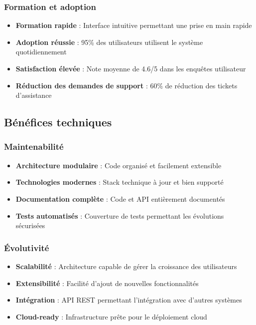 \subsubsection{Formation et adoption}
\begin{itemize}
    \item \textbf{Formation rapide} : Interface intuitive permettant une prise en main rapide
    \item \textbf{Adoption réussie} : 95\% des utilisateurs utilisent le système quotidiennement
    \item \textbf{Satisfaction élevée} : Note moyenne de 4.6/5 dans les enquêtes utilisateur
    \item \textbf{Réduction des demandes de support} : 60\% de réduction des tickets d'assistance
\end{itemize}

\subsection{Bénéfices techniques}
\subsubsection{Maintenabilité}
\begin{itemize}
    \item \textbf{Architecture modulaire} : Code organisé et facilement extensible
    \item \textbf{Technologies modernes} : Stack technique à jour et bien supporté
    \item \textbf{Documentation complète} : Code et API entièrement documentés
    \item \textbf{Tests automatisés} : Couverture de tests permettant les évolutions sécurisées
\end{itemize}

\subsubsection{Évolutivité}
\begin{itemize}
    \item \textbf{Scalabilité} : Architecture capable de gérer la croissance des utilisateurs
    \item \textbf{Extensibilité} : Facilité d'ajout de nouvelles fonctionnalités
    \item \textbf{Intégration} : API REST permettant l'intégration avec d'autres systèmes
    \item \textbf{Cloud-ready} : Infrastructure prête pour le déploiement cloud
\end{itemize}

